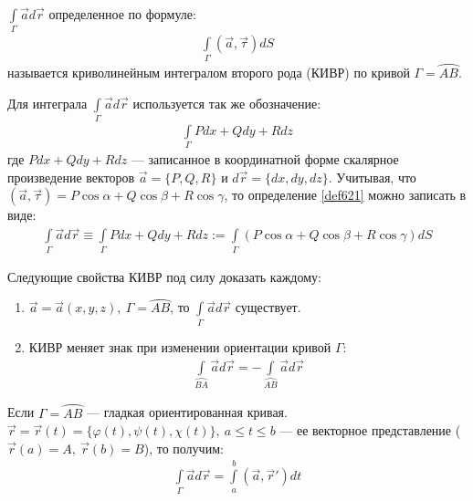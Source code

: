 \begin{definition}
  \label{def621}
  $\int\limits_\Gamma \vec a d \vec r$ определенное по формуле:
  \begin{gather}
    \int\limits_\Gamma (\vec a, \vec \tau) dS
    \label{def621:int1}
  \end{gather}
  называется криволинейным интегралом второго рода (КИВР) по кривой $\Gamma =
  \wideparen{AB}$.
\end{definition}

Для интеграла $\int\limits_\Gamma \vec a d \vec r$ используется так же
обозначение:
\begin{gather*}
  \int\limits_\Gamma Pdx + Qdy + Rdz
\end{gather*}
где $Pdx + Qdy + Rdz$ --- записанное в координатной форме скалярное
произведение векторов $\vec a = \{P, Q, R\}$ и $d \vec r = \{dx, dy, dz\}$.
Учитывая, что $(\vec a, \vec \tau) = P \cos \alpha + Q \cos \beta + R \cos
\gamma$, то определение \eqref{def621} можно записать в виде:
\begin{gather}
  \int\limits_\Gamma \vec a d \vec r \equiv \int\limits_\Gamma Pdx + Qdy + Rdz
  := \int\limits_\Gamma (P\cos \alpha + Q \cos \beta + R \cos \gamma) dS
  \label{def621:int2}
\end{gather}

Следующие свойства КИВР под силу доказать каждому:
\begin{enumerate}
  \item $\vec a = \vec a(x, y, z), \ \Gamma = \wideparen{AB}$, то
    $\int\limits_\Gamma \vec a d \vec r$ существует.
  \item КИВР меняет знак при изменении ориентации кривой $\Gamma$:
    \begin{gather*}
      \int\limits_{\wideparen{BA}} \vec a d \vec r =
      -\int\limits_{\wideparen{AB}} \vec a d \vec r
    \end{gather*}
\end{enumerate}

\begin{theorem}
  Если $\Gamma = \wideparen{AB}$ --- гладкая ориентированная кривая. \\ $\vec r =
  \vec r(t) = \{\varphi(t), \psi(t), \chi(t)\}, \ a \leq t \leq b$ --- ее
  векторное представление ($\vec r(a) = A, \ \vec r(b) = B$), то получим:
  \begin{gather}
    \int\limits_\Gamma \vec a d \vec r = \int\limits_a^b (\vec a, \vec r') dt
    \label{th621:eq1}
  \end{gather}
\end{theorem}

